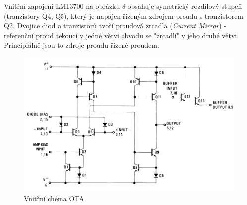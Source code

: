 \documentclass[twoside]{article}
\begin{document}
\noindent Vnitřní zapojení LM13700 na obrázku 8 obsahuje symetrický rozdílový stupeň (tranzistory Q4, Q5), který je napájen řízeným zdrojem proudu s tranzistorem Q2. Dvojice diod a tranzistorů tvoří proudová zrcadla (\textit{Current Mirror}) - referenční proud tekoucí v jedné větvi obvodu se "zrcadlí" v jeho druhé větvi. Principiálně jsou to zdroje proudu řízené proudem. 
\begin{figure}[H]
\centering
\includegraphics[scale=0.75]{image5.png}
\caption{Vnitřní chéma OTA \cite{6}}
\end{figure}
\newpage
\end{document}
